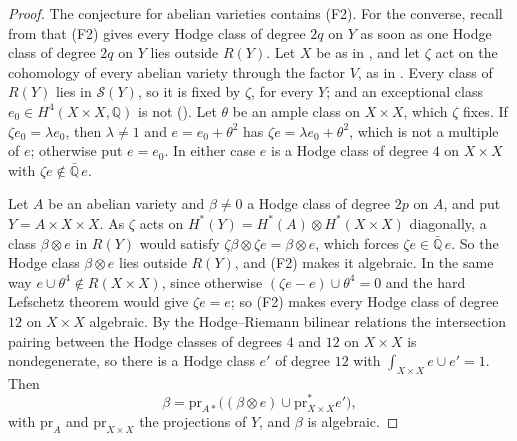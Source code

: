 \documentclass[11pt,reqno]{amsart}
\theoremstyle{plain}
\theoremstyle{definition}
\theoremstyle{remark}
\newcommand{\QQ}{\mathbb{Q}}
\newcommand{\cS}{\mathcal{S}}
\begin{document}
\begin{proof}
The conjecture for abelian varieties contains (F2). For the converse, recall
from  that (F2) gives every Hodge class of degree $2q$ on
$Y$ as soon as one Hodge class of degree $2q$ on $Y$ lies outside $R(Y)$. Let
$X$ be as in , and let $\zeta$ act on the cohomology of
every abelian variety through the factor $V$, as in .
Every class of $R(Y)$ lies in $\cS(Y)$, so it is fixed by $\zeta$, for every
$Y$; and an exceptional class $e_{0}\in H^{4}(X\times X,\QQ)$ is not
(). Let $\theta$ be an ample class on $X\times X$,
which $\zeta$ fixes. If $\zeta e_{0}=\lambda e_{0}$, then $\lambda\ne1$ and
$e=e_{0}+\theta^{2}$ has $\zeta e=\lambda e_{0}+\theta^{2}$, which is not a
multiple of $e$; otherwise put $e=e_{0}$. In either case $e$ is a Hodge class
of degree $4$ on $X\times X$ with $\zeta e\notin\bar{\QQ}\,e$.

Let $A$ be an abelian variety and $\beta\ne0$ a Hodge class of degree $2p$ on
$A$, and put $Y=A\times X\times X$. As $\zeta$ acts on
$H^{*}(Y)=H^{*}(A)\otimes H^{*}(X\times X)$ diagonally, a class
$\beta\otimes e$ in $R(Y)$ would satisfy
$\zeta\beta\otimes\zeta e=\beta\otimes e$, which forces $\zeta e\in\bar{\QQ}\,e$.
So the Hodge class $\beta\otimes e$ lies outside $R(Y)$, and (F2) makes it
algebraic. In the same way $e\cup\theta^{4}\notin R(X\times X)$, since
otherwise $(\zeta e-e)\cup\theta^{4}=0$ and the hard Lefschetz theorem would
give $\zeta e=e$; so (F2) makes every Hodge class of degree $12$ on
$X\times X$ algebraic. By the Hodge--Riemann bilinear relations the
intersection pairing between the Hodge classes of degrees $4$ and $12$ on
$X\times X$ is nondegenerate, so there is a Hodge class $e'$ of degree $12$
with $\int_{X\times X}e\cup e'=1$. Then
\[
  \beta=\mathrm{pr}_{A*}\bigl((\beta\otimes e)\cup
  \mathrm{pr}_{X\times X}^{*}e'\bigr),
\]
with $\mathrm{pr}_{A}$ and $\mathrm{pr}_{X\times X}$ the projections of $Y$,
and $\beta$ is algebraic.
\end{proof}
\end{document}
